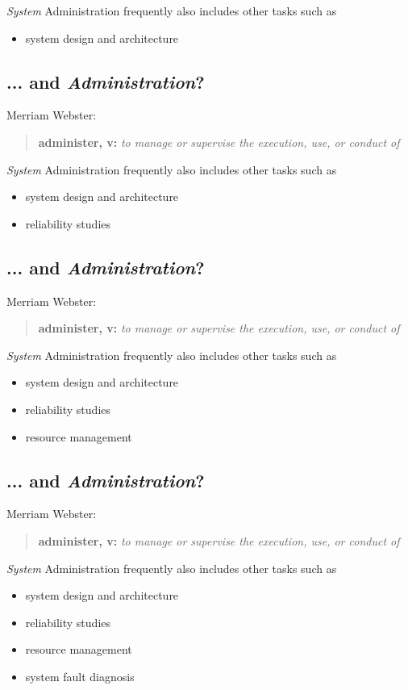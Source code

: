 \documentclass[xga]{xdvislides}
\begin{document}
{\em System} Administration frequently also includes other tasks such as
\begin{itemize}
	\item system design and architecture
\end{itemize}

\subsection{... and {\em Administration}?}
Merriam Webster:
\begin{quote}
	{\bf administer, v:} {\em to manage or supervise the execution, use, or conduct of} \\
\end{quote}

{\em System} Administration frequently also includes other tasks such as
\begin{itemize}
	\item system design and architecture
	\item reliability studies
\end{itemize}

\subsection{... and {\em Administration}?}
Merriam Webster:
\begin{quote}
	{\bf administer, v:} {\em to manage or supervise the execution, use, or conduct of} \\
\end{quote}


{\em System} Administration frequently also includes other tasks such as
\begin{itemize}
	\item system design and architecture
	\item reliability studies
	\item resource management
\end{itemize}

\subsection{... and {\em Administration}?}
Merriam Webster:
\begin{quote}
	{\bf administer, v:} {\em to manage or supervise the execution, use, or conduct of} \\
\end{quote}

{\em System} Administration frequently also includes other tasks such as
\begin{itemize}
	\item system design and architecture
	\item reliability studies
	\item resource management
	\item system fault diagnosis
\end{itemize}
\end{document}
